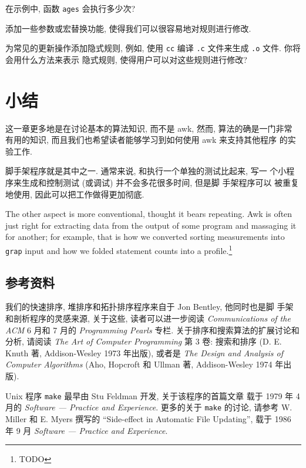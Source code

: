 \begin{exercise}
    在示例中, 函数 \texttt{ages} 会执行多少次?
\end{exercise}

\begin{exercise}
    添加一些参数或宏替换功能, 使得我们可以很容易地对规则进行修改.
\end{exercise}

\begin{exercise}
    为常见的更新操作添加隐式规则, 例如, 使用 \texttt{cc} 编译 
    \texttt{.c} 文件来生成 \texttt{.o} 文件. 你将会用什么方法来表示
    隐式规则, 使得用户可以对这些规则进行修改?
\end{exercise}

\section{小结}
\label{sec:experiments_with_algorithms_summary}

这一章更多地是在讨论基本的算法知识, 而不是 awk, 然而, 算法的确是一门非常
有用的知识, 而且我们也希望读者能够学习到如何使用 awk 来支持其他程序
的实验工作.

脚手架程序就是其中之一. 通常来说, 和执行一个单独的测试比起来, 写一 
个小程序来生成和控制测试 (或调试) 并不会多花很多时间, 但是脚 
手架程序可以 被重复地使用, 因此可以把工作做得更加彻底.

The other aspect is more conventional, thought it bears repeating. Awk 
is often just right for extracting data from the output of some program and
massaging it for another; for example, that is how we converted sorting
measurements into \texttt{grap} input and how we folded statement counts
into a profile.\footnote{TODO}

\subsection*{参考资料}

我们的快速排序, 堆排序和拓扑排序程序来自于 Jon Bentley, 他同时也是脚
手架和剖析程序的灵感来源, 关于这些, 读者可以进一步阅读
\textit{Communications of the ACM} 6 月和 7 月的 
\textit{Programming Pearls} 专栏. 关于排序和搜索算法的扩展讨论和分析,
请阅读 \textit{The Art of Computer Programming} 第 3 卷: 搜索和排序
(D. E. Knuth 著, Addison-Wesley 1973 年出版), 或者是 \textit{The Design and
Analysis of Computer Algorithms} (Aho, Hopcroft 和 Ullman 著, 
Addison-Wesley 1974 年出版).

Unix 程序 \texttt{make} 最早由 Stu Feldman 开发, 关于该程序的首篇文章
载于 1979 年 4 月的 \textit{Software --- Practice and Experience}.
更多的关于 \texttt{make} 的讨论, 请参考 W. Miller 和 E. Myers 撰写的
``Side-effect in Automatic File Updating'', 载于 1986 年 9 月
\textit{Software --- Practice and Experience}.
